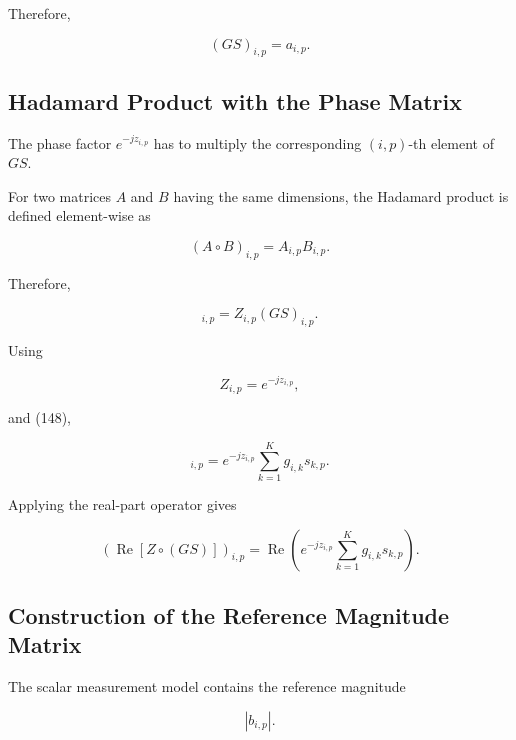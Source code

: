 \documentclass[12pt,a4paper]{article}
\begin{document}
Therefore,

\begin{equation}
(GS)_{i,p}=a_{i,p}.
\tag{149}
\end{equation}

\subsection{Hadamard Product with the Phase Matrix}

The phase factor $e^{-jz_{i,p}}$ has to multiply the corresponding $(i,p)$-th element of $GS$.

For two matrices $A$ and $B$ having the same dimensions, the Hadamard product is defined element-wise as

\begin{equation}
(A\circ B)_{i,p}
=
A_{i,p}B_{i,p}.
\tag{150}
\end{equation}

Therefore,

\begin{equation}
[Z\circ(GS)]_{i,p}
=
Z_{i,p}(GS)_{i,p}.
\tag{151}
\end{equation}

Using

\begin{equation}
Z_{i,p}=e^{-jz_{i,p}},
\tag{152}
\end{equation}

and (148),

\begin{equation}
[Z\circ(GS)]_{i,p}
=
e^{-jz_{i,p}}
\sum_{k=1}^{K}
g_{i,k}s_{k,p}.
\tag{153}
\end{equation}

Applying the real-part operator gives

\begin{equation}
\left(
\operatorname{Re}[Z\circ(GS)]
\right)_{i,p}
=
\operatorname{Re}
\left(
e^{-jz_{i,p}}
\sum_{k=1}^{K}
g_{i,k}s_{k,p}
\right).
\tag{154}
\end{equation}

\subsection{Construction of the Reference Magnitude Matrix}

The scalar measurement model contains the reference magnitude

\begin{equation}
|b_{i,p}|.
\tag{155}
\end{equation}
\end{document}
